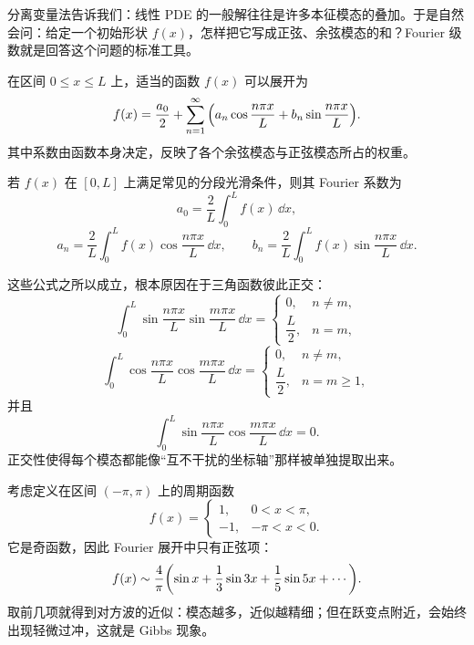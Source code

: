 分离变量法告诉我们：线性 PDE 的一般解往往是许多本征模态的叠加。于是自然会问：给定一个初始形状 $f(x)$，怎样把它写成正弦、余弦模态的和？Fourier 级数就是回答这个问题的标准工具。

\begin{definition}[Fourier 级数]
在区间 $0\le x\le L$ 上，适当的函数 $f(x)$ 可以展开为
\[
  f(x)=\frac{a_0}{2}+\sum_{n=1}^{\infty}\qty(a_n\cos\frac{n\pi x}{L}+b_n\sin\frac{n\pi x}{L}).
\]
其中系数由函数本身决定，反映了各个余弦模态与正弦模态所占的权重。
\end{definition}

\begin{theorem}
若 $f(x)$ 在 $[0,L]$ 上满足常见的分段光滑条件，则其 Fourier 系数为
\[
  a_0=\frac{2}{L}\int_0^L f(x)\,\dd x,
\]
\[
  a_n=\frac{2}{L}\int_0^L f(x)\cos\frac{n\pi x}{L}\,\dd x,
  \qquad
  b_n=\frac{2}{L}\int_0^L f(x)\sin\frac{n\pi x}{L}\,\dd x.
\]
\end{theorem}

这些公式之所以成立，根本原因在于三角函数彼此正交：
\[
  \int_0^L \sin\frac{n\pi x}{L}\sin\frac{m\pi x}{L}\,\dd x=
  \begin{cases}
    0, & n\ne m,\\[4pt]
    \dfrac{L}{2}, & n=m,
  \end{cases}
\]
\[
  \int_0^L \cos\frac{n\pi x}{L}\cos\frac{m\pi x}{L}\,\dd x=
  \begin{cases}
    0, & n\ne m,\\[4pt]
    \dfrac{L}{2}, & n=m\ge 1,
  \end{cases}
\]
并且
\[
  \int_0^L \sin\frac{n\pi x}{L}\cos\frac{m\pi x}{L}\,\dd x=0.
\]
正交性使得每个模态都能像“互不干扰的坐标轴”那样被单独提取出来。

\begin{example}[方波展开]
考虑定义在区间 $(-\pi,\pi)$ 上的周期函数
\[
  f(x)=
  \begin{cases}
    1, & 0<x<\pi,\\
    -1, & -\pi<x<0.
  \end{cases}
\]
它是奇函数，因此 Fourier 展开中只有正弦项：
\[
  f(x)\sim \frac{4}{\pi}\qty(\sin x+\frac{1}{3}\sin 3x+\frac{1}{5}\sin 5x+\cdots).
\]
取前几项就得到对方波的近似：模态越多，近似越精细；但在跃变点附近，会始终出现轻微过冲，这就是 Gibbs 现象。
\end{example}

